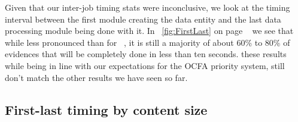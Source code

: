 Given that our inter-job timing stats were inconclusive, we look at the timing interval between the first module creating the data entity and the last data processing module being done with it. In ~\ref{fig:FirstLast} on page ~\pageref{fig:FirstLast} we see that while less pronounced than for ~\pageref{fig:InterJob}, it is still a majority of about 60\% to 80\% of evidences that will be completely done in less than ten seconds. these results while being in line with our expectations for the OCFA priority system, still don't match the other results we have seen so far.
\subsection{First-last timing by content size}
\begin{figure}
\centering
{}
\hspace{0mm}
\end{figure}
